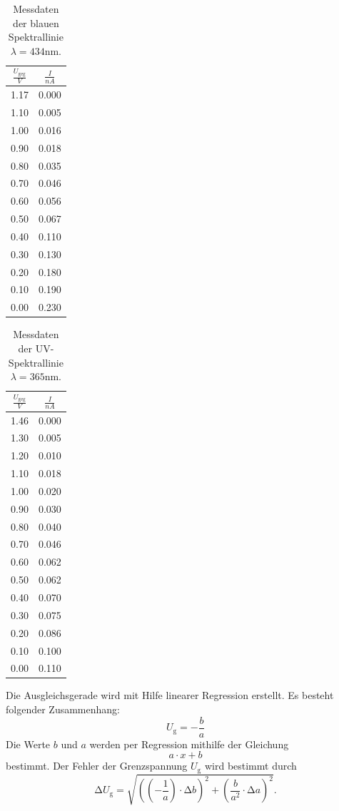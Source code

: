 \documentclass[
  bibliography=totoc,     %
  captions=tableheading,  %
  titlepage=firstiscover, %
]{scrartcl}
\begin{document}
\begin{table}
\centering
	\label{tab:blau}
	\caption{Messdaten der blauen Spektrallinie $\lambda = 434 \text{nm}$.}
	\begin{tabular}{c|c}
		\toprule
		{$\frac{U_\text{geg}}{V}$}&{$\frac{I}{nA}$} \\
		\hline
        \midrule
	1.17 &0.000\\
	1.10 &0.005\\
	1.00 &0.016\\
	0.90 &0.018\\
	0.80 &0.035\\
	0.70 &0.046\\
	0.60 &0.056\\
	0.50 &0.067\\
	0.40 &0.110\\
	0.30 &0.130\\
	0.20 &0.180\\
	0.10 &0.190\\
	0.00 &0.230\\
	\bottomrule 
	\end{tabular}
\end{table}
\begin{table}
\centering
	\label{tab:UV}
	\caption{Messdaten der UV-Spektrallinie $\lambda = 365 \text{nm}$.}
	\begin{tabular}{c|c}
		\toprule
		{$\frac{U_\text{geg}}{V}$}&{$\frac{I}{nA}$} \\
		\hline
        \midrule
        1.46 &0.000\\
	1.30 &0.005\\
	1.20 &0.010\\
	1.10 &0.018\\
	1.00 &0.020\\
	0.90 &0.030\\
	0.80 &0.040\\
	0.70 &0.046\\
	0.60 &0.062\\
	0.50 &0.062\\
	0.40 &0.070\\
	0.30 &0.075\\
	0.20 &0.086\\
	0.10 &0.100\\
	0.00 &0.110\\	
	\bottomrule 
	\end{tabular}
\end{table}

Die Ausgleichsgerade wird mit Hilfe linearer Regression erstellt. Es besteht folgender Zusammenhang:
\begin{equation}
	U_\text{g} = -\frac{b}{a}
\end{equation}
Die Werte $b$ und $a$ werden per Regression mithilfe der Gleichung
\begin{equation*}
	a \cdot x + b
\end{equation*}
bestimmt. 
Der Fehler der Grenzspannung $U_\text{g}$ wird bestimmt durch
\begin{equation}
	\increment U_\text{g} = \sqrt{\left(\left(-\frac{1}{a}\right)\cdot \increment b \right)^2 + \left(\frac{b}{a^2}\cdot \increment a \right)^2} .
\end{equation}
\end{document}
